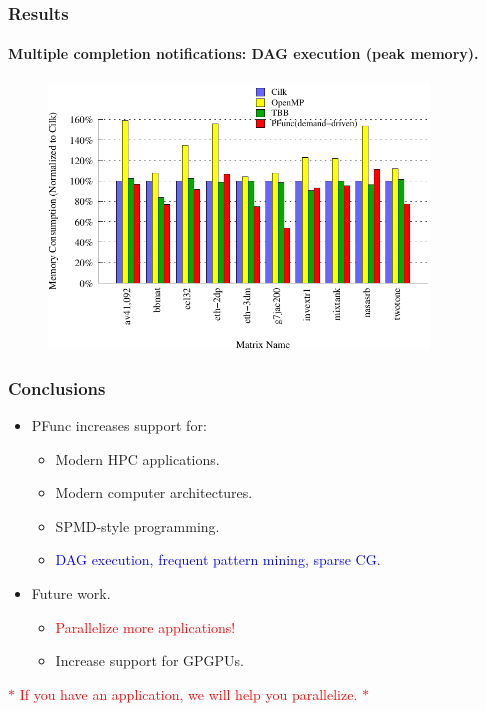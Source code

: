 \documentclass{beamer}
\begin{document}
\begin{frame}[fragile]
\frametitle{Results}
\framesubtitle{Multiple completion notifications: DAG execution (peak memory).}
\begin{figure}
\includegraphics[width=0.9\textwidth]{figs/dag_memory}
\label{fig:dag_memory}
\end{figure}
\end{frame}

\begin{frame}
\frametitle{Conclusions}
\begin{itemize}
\item PFunc increases support for:
  \begin{itemize}
  \item Modern HPC applications.
  \item Modern computer architectures.
  \item SPMD-style programming.
  \item \textcolor{blue}{DAG execution, frequent pattern mining, sparse CG.}
  \end{itemize}
\item Future work.
  \begin{itemize}
  \item \textcolor{red}{Parallelize more applications!}
  \item Increase support for GPGPUs.
  \end{itemize}
\end{itemize}
\vspace{+10pt}
\begin{center}
\textcolor{red}{$\ast{}$ If you have an application, we will help you 
                parallelize. $\ast{}$}
\end{center}
\end{frame}
\end{document}
